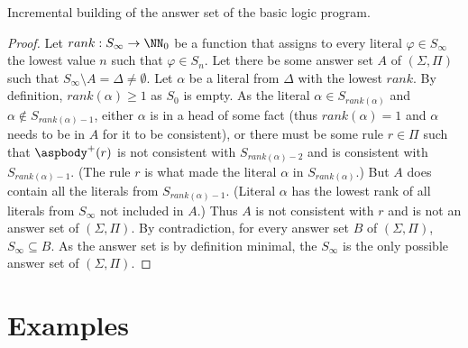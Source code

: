 \begin{lemma}{Incremental building of the answer set of the basic logic program.}
\begin{proof}
        Let $rank: S_\infty \to \NN_0$ be a function that assigns to every literal
        $\varphi \in S_\infty$ the lowest value $n$ such that $\varphi \in S_n$.
        Let there be some answer set $A$ of $(\Sigma, \Pi)$ such that
        $S_\infty\setminus A = \Delta \neq \emptyset$.
        Let $\alpha$ be a literal from $\Delta$ with the lowest $rank$.
        By definition, $rank(\alpha) \geq 1$ as $S_0$ is empty.
        As the literal $\alpha\in S_{rank(\alpha)}$ and $\alpha \not\in S_{rank(\alpha)-1}$,
        either $\alpha$ is in a head of some fact (thus $rank(\alpha)=1$ and $\alpha$
        needs to be in $A$ for it to be consistent),
        or there must be some rule $r\in\Pi$ such that $\aspbody^+(r)$ is not consistent
        with $S_{rank(\alpha)-2}$ and is consistent with $S_{rank(\alpha)-1}$.
        (The rule $r$ is what made the literal $\alpha$ in $S_{rank(\alpha)}$.)
        But $A$ does contain all the literals from $S_{rank(\alpha)-1}$. (Literal $\alpha$
        has the lowest rank of all literals from $S_\infty$ not included in $A$.)
        Thus $A$ is not consistent with $r$ and is not an answer set of $(\Sigma, \Pi)$.
        By contradiction, for every answer set $B$ of $(\Sigma, \Pi)$,
        $S_\infty \subseteq B$. As the answer set is by definition minimal,
        the $S_\infty$ is the only possible answer set of $(\Sigma, \Pi)$.
    \end{proof}
\end{lemma}

\section{Examples}

